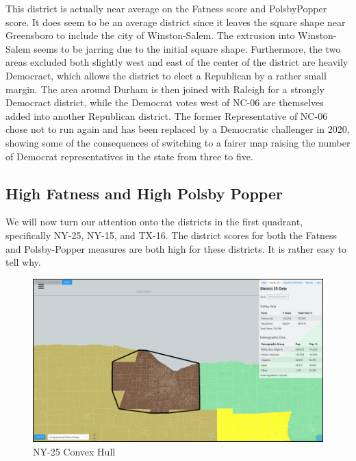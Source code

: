 \documentclass[letterpaper]{article}
\begin{document}
This district is actually near average on the Fatness score and PolsbyPopper score. It does seem to be an average district since it leaves the square shape near Greensboro to include the city of Winston-Salem. The extrusion into Winston-Salem seems to be jarring due to the initial square shape. Furthermore, the two areas excluded both slightly west and east of the center of the district are heavily Democract, which allows the district to elect a Republican by a rather small margin. The area around Durham is then joined with Raleigh for a strongly Democract district, while the Democrat votes west of NC-06 are themselves added into another Republican district. The former Representative of NC-06 chose not to run again and has been replaced by a Democratic challenger in 2020, showing some of the consequences of switching to a fairer map raising the number of Democrat representatives in the state from three to five.

\subsection{High Fatness and High Polsby Popper}
We will now turn our attention onto the districts in the first quadrant, specifically NY-25, NY-15, and TX-16. The district scores for both the Fatness and Polsby-Popper measures are both high for these districts. It is rather easy to tell why.

\begin{figure}[H]
	\includegraphics[width=\linewidth]{./figures/NY-25-ConvexHull.png}
	\caption{NY-25 Convex Hull}
	\label{fig:ny25convexHull}
\end{figure}
\end{document}
